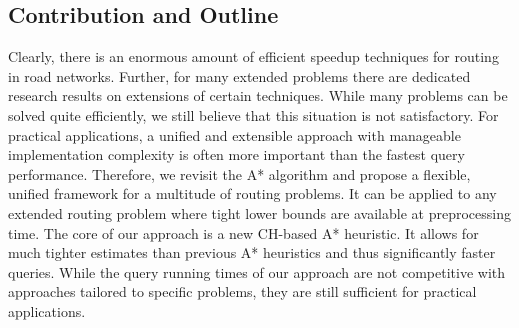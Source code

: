 \documentclass[manuscript,review]{acmart}
\begin{document}

\subsection{Contribution and Outline}

Clearly, there is an enormous amount of efficient speedup techniques for routing in road networks.
Further, for many extended problems there are dedicated research results on extensions of certain techniques.
While many problems can be solved quite efficiently, we still believe that this situation is not satisfactory.
For practical applications, a unified and extensible approach with manageable implementation complexity is often more important than the fastest query performance.
Therefore, we revisit the A* algorithm and propose a flexible, unified framework for a multitude of routing problems.
It can be applied to any extended routing problem where tight lower bounds are available at preprocessing time.
The core of our approach is a new CH-based A* heuristic.
It allows for much tighter estimates than previous A* heuristics and thus significantly faster queries.
While the query running times of our approach are not competitive with approaches tailored to specific problems, they are still sufficient for practical applications.
\end{document}
